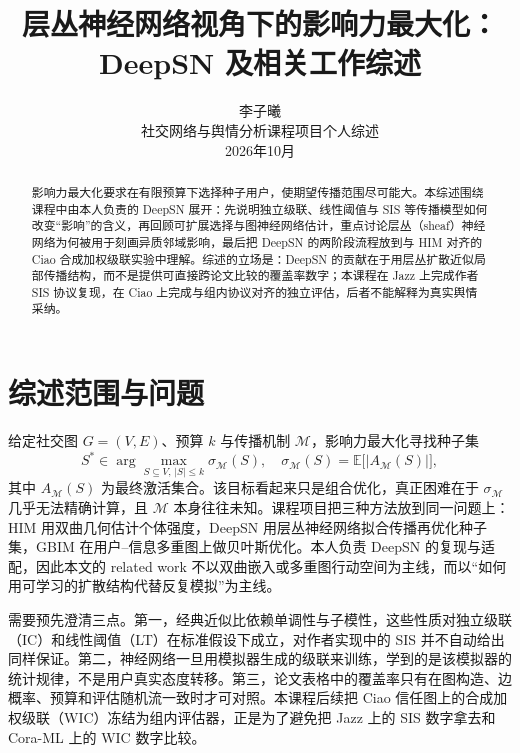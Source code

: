 \documentclass[a4paper,11pt,twocolumn]{ctexart}
\begin{document}
\title{层丛神经网络视角下的影响力最大化：DeepSN 及相关工作综述}
\author{李子曦\\社交网络与舆情分析课程项目个人综述\\2026年10月}
\date{}
\maketitle

\begin{abstract}
影响力最大化要求在有限预算下选择种子用户，使期望传播范围尽可能大。本综述围绕课程中由本人负责的 DeepSN 展开：先说明独立级联、线性阈值与 SIS 等传播模型如何改变“影响”的含义，再回顾可扩展选择与图神经网络估计，重点讨论层丛（sheaf）神经网络为何被用于刻画异质邻域影响，最后把 DeepSN 的两阶段流程放到与 HIM 对齐的 Ciao 合成加权级联实验中理解。综述的立场是：DeepSN 的贡献在于用层丛扩散近似局部传播结构，而不是提供可直接跨论文比较的覆盖率数字；本课程在 Jazz 上完成作者 SIS 协议复现，在 Ciao 上完成与组内协议对齐的独立评估，后者不能解释为真实舆情采纳。
\end{abstract}

\section{综述范围与问题}

给定社交图 $G=(V,E)$、预算 $k$ 与传播机制 $\mathcal{M}$，影响力最大化寻找种子集
\begin{equation}
S^*\in\arg\max_{S\subseteq V,\,|S|\le k}\sigma_{\mathcal{M}}(S),\quad
\sigma_{\mathcal{M}}(S)=\mathbb{E}\bigl[|A_{\mathcal{M}}(S)|\bigr],
\end{equation}
其中 $A_{\mathcal{M}}(S)$ 为最终激活集合。该目标看起来只是组合优化，真正困难在于 $\sigma_{\mathcal{M}}$ 几乎无法精确计算，且 $\mathcal{M}$ 本身往往未知。课程项目把三种方法放到同一问题上：HIM 用双曲几何估计个体强度，DeepSN 用层丛神经网络拟合传播再优化种子集，GBIM 在用户--信息多重图上做贝叶斯优化。本人负责 DeepSN 的复现与适配，因此本文的 related work 不以双曲嵌入或多重图行动空间为主线，而以“如何用可学习的扩散结构代替反复模拟”为主线。

需要预先澄清三点。第一，经典近似比依赖单调性与子模性，这些性质对独立级联（IC）和线性阈值（LT）在标准假设下成立，对作者实现中的 SIS 并不自动给出同样保证。第二，神经网络一旦用模拟器生成的级联来训练，学到的是该模拟器的统计规律，不是用户真实态度转移。第三，论文表格中的覆盖率只有在图构造、边概率、预算和评估随机流一致时才可对照。本课程后续把 Ciao 信任图上的合成加权级联（WIC）冻结为组内评估器，正是为了避免把 Jazz 上的 SIS 数字拿去和 Cora-ML 上的 WIC 数字比较。
\end{document}
